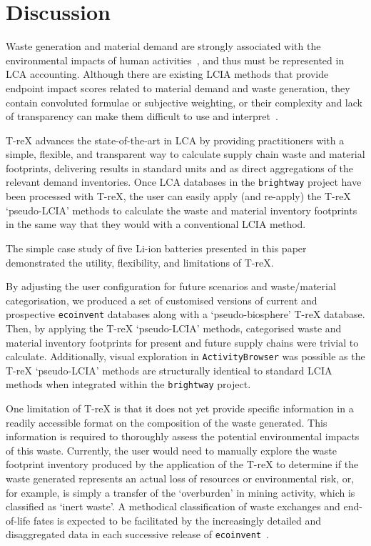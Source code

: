 \documentclass[a4paper,fleqn]{cas-dc}
\begin{document}
\section{Discussion}\label{sec:discussion}
Waste generation and material demand are strongly associated with the environmental impacts of human activities~\citep{laurenti2023wastefootprint,steinmann2017resourcefootprints, demirer2019wastefootprint}, and thus must be represented in LCA accounting. Although there are existing LCIA methods that provide endpoint impact scores related to material demand and waste generation, they contain convoluted formulae or subjective weighting, or their complexity and lack of transparency can make them difficult to use and interpret~\citep{foen2021ecofactors,hauschild2003edip,cen2019en15804, arvidsson2020csi,foen2021ecofactors}.

T-reX advances the state-of-the-art in LCA by providing practitioners with a simple, flexible, and transparent way to calculate supply chain waste and material footprints, delivering results in standard units and as direct aggregations of the relevant demand inventories. Once LCA databases in the \texttt{brightway} project have been processed with T-reX, the user can easily apply (and re-apply) the T-reX `pseudo-LCIA' methods to calculate the waste and material inventory footprints in the same way that they would with a conventional LCIA method.

The simple case study of five Li-ion batteries presented in this paper demonstrated the utility, flexibility, and limitations of T-reX.

By adjusting the user configuration for future scenarios and waste/material categorisation, we produced a set of customised versions of current and prospective \texttt{ecoinvent} databases along with a `pseudo-biosphere' T-reX database. Then, by applying the T-reX `pseudo-LCIA' methods, categorised waste and material inventory footprints for present and future supply chains were trivial to calculate. Additionally, visual exploration in \texttt{ActivityBrowser} was possible as the T-reX `pseudo-LCIA' methods are structurally identical to standard LCIA methods when integrated within the \texttt{brightway} project.

One limitation of T-reX is that it does not yet provide specific information in a readily accessible format on the composition of the waste generated. This information is required to thoroughly assess the potential environmental impacts of this waste. Currently, the user would need to manually explore the waste footprint inventory produced by the application of the T-reX to determine if the waste generated represents an actual loss of resources or environmental risk, or, for example, is simply a transfer of the `overburden' in mining activity, which is classified as `inert waste'. A methodical classification of waste exchanges and end-of-life fates is expected to be facilitated by the increasingly detailed and disaggregated data in each successive release of \texttt{ecoinvent}~\citep{fitzgerald2023ecoinventdocumentation}.
\end{document}
